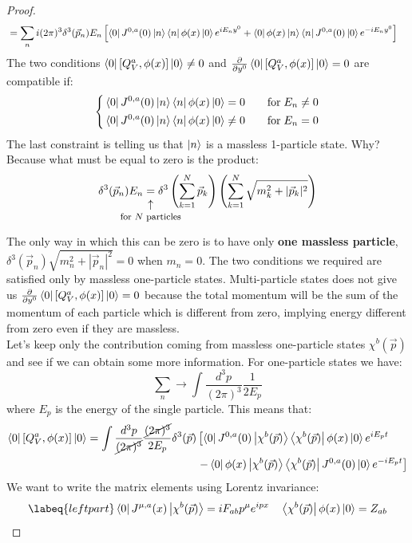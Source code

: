 \documentclass[../main.tex]{subfiles}
\begin{document}
\begin{proof}
\begin{align*}
&=\sum_ni(2\pi)^3\delta^3(\Vec{p}_n)E_n\left[\bra{0}J^{0,a}(0)\ket{n}\bra{n}\phi(x)\ket{0}e^{iE_ny^0}+\bra{0}\phi(x)\ket{n}\bra{n}J^{0,a}(0)\ket{0}e^{-iE_ny^0}\right]
\end{align*}
The two conditions $\bra{0}[Q_V^a,\phi(x)]\ket{0}\neq0$ and $\frac{\partial}{\partial y^0}\bra{0}[Q_V^a,\phi(x)]\ket{0}=0$ are compatible if:
\[
\left\{
\begin{aligned}
&\bra{0}J^{0,a}(0)\ket{n}\bra{n}\phi(x)\ket{0}=0\quad &&\text{for}\;E_n\neq0\\
&\bra{0}J^{0,a}(0)\ket{n}\bra{n}\phi(x)\ket{0}\neq0\quad &&\text{for}\;E_n=0
\end{aligned}
\right.
\]
The last constraint is telling us that $\ket{n}$ is a massless 1-particle state. Why? Because what must be equal to zero is the product:
\[
\delta^3(\Vec{p}_n)E_n\underset{\mathclap{\tikz \node {$\uparrow$} node [below=1ex] {\footnotesize for $N$ particles };}}{=}\delta^3\left(\sum_{k=1}^N\Vec{p}_k\right)\left(\sum_{k=1}^N\sqrt{m_k^2+|\Vec{p}_k|^2}\right)
\]
The only way in which this can be zero is to have only \textbf{one massless particle}, $\delta^3(\Vec{p}_n)\sqrt{m_n^2+|\Vec{p}_n|^2}=0$ when $m_n=0$. The two conditions we required are satisfied only by massless one-particle states. Multi-particle states does not give us $\frac{\partial}{\partial y^0}\bra{0}[Q_V^a,\phi(x)]\ket{0}=0$ because the total momentum will be the sum of the momentum of each particle which is different from zero, implying energy different from zero even if they are massless.\\   
Let's keep only the contribution coming from massless one-particle states $\chi^b(\Vec{p})$ and see if we can obtain some more information. For one-particle states we have:
\[
\sum_n\to\int\frac{d^3p}{(2\pi)^3}\frac{1}{2E_p}
\]
where $E_p$ is the energy of the single particle. This means that:
\begin{align*}
\bra{0}[Q_V^a,\phi(x)]\ket{0}=\int\frac{d^3p}{\cancel{(2\pi)^3}}\frac{\cancel{(2\pi)^3}}{2E_p}\delta^3(\Vec{p})&\left[\bra{0}J^{0,a}(0)\ket{\chi^b(\Vec{p})}\bra{\chi^b(\Vec{p})}\phi(x)\ket{0}e^{iE_pt}\right.\\
&\left.-\bra{0}\phi(x)\ket{\chi^b(\Vec{p})}\bra{\chi^b(\Vec{p})}J^{0,a}(0)\ket{0}e^{-iE_pt}\right]
\end{align*}
We want to write the matrix elements using Lorentz invariance:
\begin{equation}
\labeq{leftpart}
\bra{0}J^{\mu,a}(x)\ket{\chi^b(\Vec{p})}=iF_{ab}p^\mu e^{ipx} \quad \bra{\chi^b(\Vec{p})}\phi(x)\ket{0}=Z_{ab}

\end{equation}
\end{proof}
\end{document}
